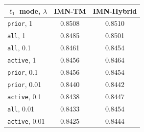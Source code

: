 \begin{tabular}{lcc}
\toprule
$\ell_1$ mode, $\lambda$ & IMN-TM & IMN-Hybrid \\
\midrule
\texttt{prior}, 1 & 0.8508 & 0.8510 \\
\texttt{all}, 1 & 0.8485 & 0.8501 \\
\texttt{all}, 0.1 & 0.8461 & 0.8454 \\
\texttt{active}, 1 & 0.8456 & 0.8464 \\
\texttt{prior}, 0.1 & 0.8456 & 0.8454 \\
\texttt{prior}, 0.01 & 0.8440 & 0.8442 \\
\texttt{active}, 0.1 & 0.8438 & 0.8447 \\
\texttt{all}, 0.01 & 0.8433 & 0.8454 \\
\texttt{active}, 0.01 & 0.8425 & 0.8444 \\
\bottomrule
\end{tabular}
